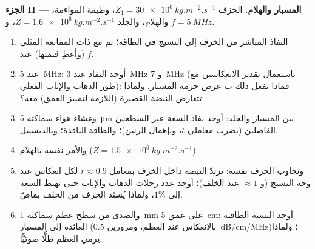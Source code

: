 \begin{problem}
\medskip
\noindent\textbf{الجزء II --- المسبار والهلام.}
الخزف $Z_1 = \qty{30e6}{kg.m^{-2}.s^{-1}}$، وطبقة المواءمة، والهلام، والجلد $Z =
\qty{1.6e6}{kg.m^{-2}.s^{-1}}$، و $f = \qty{5}{MHz}$.
\begin{enumerate}[resume]
  \item النفاذ المباشر من الخزف إلى النسيج في الطاقة؛ ثم مع
         ذات الممانعة المثلى (وأعطِ قيمتها) عند $f$.
  \item {} عند \qty{5}{MHz}: أوجد النفاذ
        عند \qty{3}{MHz} و \qty{7}{MHz} (باستعمال تقدير الانعكاسين
        مع طور الذهاب والإياب الفعلي): فماذا يفعل ذلك ب
        عرض حزمة المسبار، ولماذا تتعارض النبضة القصيرة (اللازمة لتمييز
        العمق) معه؟
  \item وغشاء هواء سماكته \qty{5}{\micro m} بين المسبار والجلد: أوجد نفاذ
        السعة عبر السطحين الفاصلين (بضرب معاملي $t$،
        وبإهمال الرنين)؛ والطاقة النافذة؛ وبالديسيبل.
  \item والأمر نفسه بالهلام ($Z = \qty{1.5e6}{kg.m^{-2}.s^{-1}}$).
  \item وتجاوب الخزف نفسه: ترتدّ النبضة داخل
        الخزف بمعامل $r \approx 0.9$ لكل انعكاس عند وجه النسيج
        (و $\approx 1$ عند الخلف)؛ أوجد عدد رحلات الذهاب والإياب حتى تهبط
        السعة إلى $1\%$، ولماذا يُسنَد الخزف من الخلف بماصّ.
  \item والصدى من سطح عظم سماكته \qty{1}{mm} على عمق \qty{5}{cm}: أوجد النسبة
        الطاقية العائدة إلى المسبار (بالانعكاس عند العظم، ومرورين
         \qty{0.5}{dB/cm/MHz})؛ ولماذا يرمي العظم ظلًّا
        صوتيًّا.
\end{enumerate}


\end{problem}
